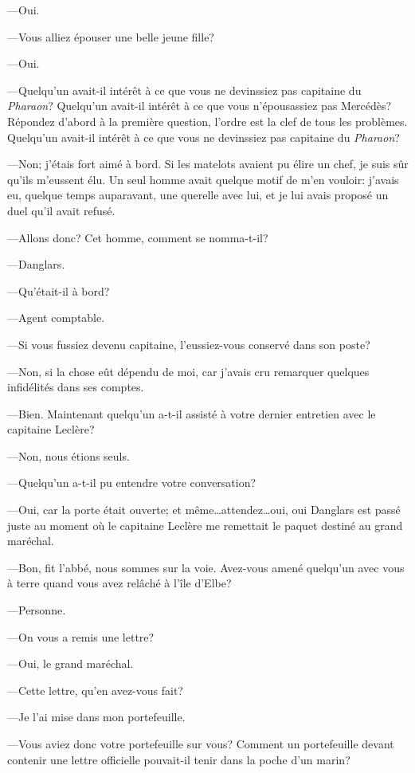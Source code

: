 —Oui.

—Vous alliez épouser une belle jeune fille?

—Oui.

—Quelqu'un avait-il intérêt à ce que vous ne devinssiez pas capitaine du \textit{Pharaon}? Quelqu'un avait-il intérêt à ce que vous n'épousassiez pas Mercédès? Répondez d'abord à la première question, l'ordre est la clef de tous les problèmes. Quelqu'un avait-il intérêt à ce que vous ne devinssiez pas capitaine du \textit{Pharaon}?

—Non; j'étais fort aimé à bord. Si les matelots avaient pu élire un chef, je suis sûr qu'ils m'eussent élu. Un seul homme avait quelque motif de m'en vouloir: j'avais eu, quelque temps auparavant, une querelle avec lui, et je lui avais proposé un duel qu'il avait refusé.

—Allons donc? Cet homme, comment se nomma-t-il?

—Danglars.

—Qu'était-il à bord?

—Agent comptable.

—Si vous fussiez devenu capitaine, l'eussiez-vous conservé dans son poste?

—Non, si la chose eût dépendu de moi, car j'avais cru remarquer quelques infidélités dans ses comptes.

—Bien. Maintenant quelqu'un a-t-il assisté à votre dernier entretien avec le capitaine Leclère?

—Non, nous étions seuls.

—Quelqu'un a-t-il pu entendre votre conversation?

—Oui, car la porte était ouverte; et même\dots attendez\dots oui, oui Danglars est passé juste au moment où le capitaine Leclère me remettait le paquet destiné au grand maréchal.

—Bon, fit l'abbé, nous sommes sur la voie. Avez-vous amené quelqu'un avec vous à terre quand vous avez relâché à l'île d'Elbe?

—Personne.

—On vous a remis une lettre?

—Oui, le grand maréchal.

—Cette lettre, qu'en avez-vous fait?

—Je l'ai mise dans mon portefeuille.

—Vous aviez donc votre portefeuille sur vous? Comment un portefeuille devant contenir une lettre officielle pouvait-il tenir dans la poche d'un marin?

